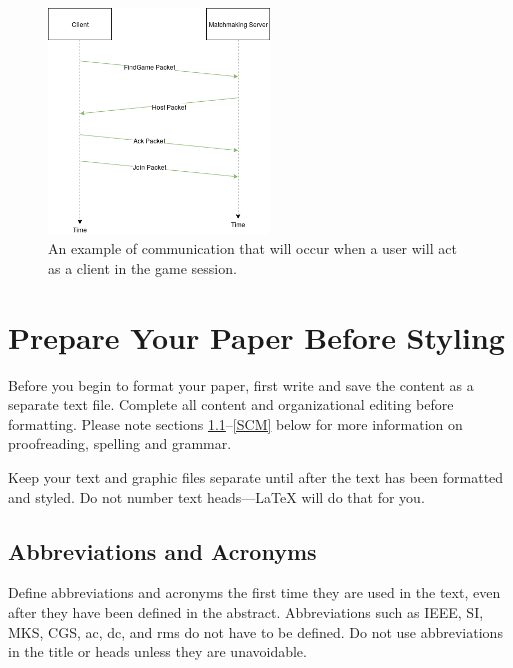 \documentclass[conference]{IEEEtran}
\begin{document}
\begin{figure}[h]
\centerline{\includegraphics[width=\linewidth, height=6cm]{figures/HostCommunication.png}}
\caption{An example of communication that will occur when a user will act as a client in the game session. }
\label{fig}
\end{figure}


\section{Prepare Your Paper Before Styling}
Before you begin to format your paper, first write and save the content as a 
separate text file. Complete all content and organizational editing before 
formatting. Please note sections \ref{AA}--\ref{SCM} below for more information on 
proofreading, spelling and grammar.

Keep your text and graphic files separate until after the text has been 
formatted and styled. Do not number text heads---{\LaTeX} will do that 
for you.

\subsection{Abbreviations and Acronyms}\label{AA}
Define abbreviations and acronyms the first time they are used in the text, 
even after they have been defined in the abstract. Abbreviations such as 
IEEE, SI, MKS, CGS, ac, dc, and rms do not have to be defined. Do not use 
abbreviations in the title or heads unless they are unavoidable.
\end{document}

